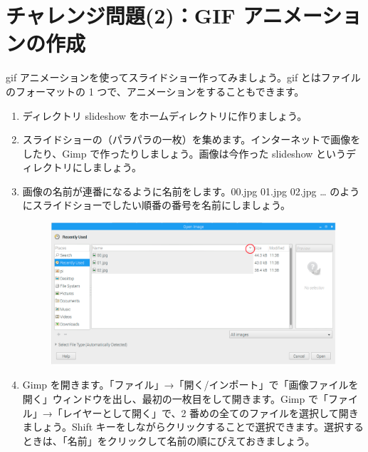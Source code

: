 \section{チャレンジ問題(2)：GIF アニメーションの作成}
\label{GIF}
gif アニメーションを使ってスライドショー作ってみましょう。gif とはファイルのフォーマットの 1 つで、アニメーションをすることもできます。\\
\begin{enumerate}
\item ディレクトリ slideshow をホームディレクトリに作りましょう。\\
\item スライドショーの（パラパラの一枚）を集めます。インターネットで画像をしたり、Gimp で作ったりしましょう。画像は今作った slideshow というディレクトリにしましょう。\\
\item 画像の名前が連番になるように名前をします。00.jpg 01.jpg 02.jpg … のようにスライドショーでしたい順番の番号を名前にしましょう。\\
\begin{figure}[H]
    \centering
    \includegraphics[width=\linewidth]{images/chap03/text03-img025.png}
\end{figure}
\item Gimp を開きます。「ファイル」→「開く/インポート」で「画像ファイルを開く」ウィンドウを出し、最初の一枚目をして開きます。Gimp で「ファイル」→「レイヤーとして開く」で、2 番めの全てのファイルを選択して開きましょう。Shift キーをしながらクリックすることで選択できます。選択するときは、「名前」をクリックして名前の順にびえておきましょう。\\

\end{enumerate}
